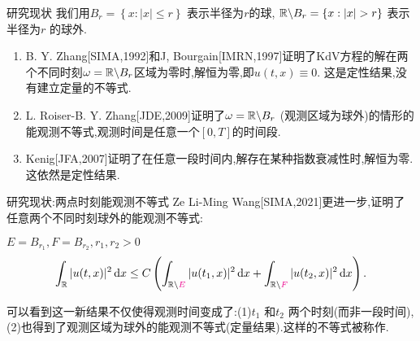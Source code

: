 \begin{frame}{研究现状}
  我们用$B_r=\left\{x:|x|\le r\right\} $ 表示半径为$r$的球,  $\R\backslash B_r=\left\{x:|x|>r\right\} $ 表示半径为$r$ 的球外.
  \begin{enumerate}
    \item B. Y. Zhang[SIMA,1992]和J, Bourgain[IMRN,1997]证明了KdV方程的解在两个不同时刻$\omega=\mathbb{R} \backslash  B_r$区域为零时,解恒为零,即$u(t,x)\equiv 0$. 这是定性结果,没有建立定量的不等式.
    \item L. Roiser-B. Y. Zhang[JDE,2009]证明了$\omega=\mathbb{R} \backslash B_r$ (观测区域为球外)的情形的能观测不等式,观测时间是任意一个$[0,T]$的时间段.
    \item Kenig[JFA,2007]证明了在任意一段时间内,解存在某种指数衰减性时,解恒为零.这依然是定性结果.
  \end{enumerate}
\end{frame}
\begin{frame}{研究现状:两点时刻能观测不等式}
  Ze Li-Ming Wang[SIMA,2021]更进一步,证明了任意两个不同时刻球外的能观测不等式:
  \begin{block}{$E=B_{r_1},F=B_{r_2},r_1,r_2>0$}
    \[
      \int_{\mathbb{R}}|u(t,x)|^2\,\mathrm{d}x\le C \left( \int_{\mathbb{R}\backslash \color{magenta}E}|u(t_1,x)|^2\,\mathrm{d}x+\int_{\mathbb{R} \backslash \color{magenta} F}|u(t_2,x)|^2\,\mathrm{d}x \right). 
    \] 
  \end{block}
  可以看到这一新结果不仅使得观测时间变成了:(1)$t_1$ 和$t_2$ 两个时刻(而非一段时间),(2)也得到了观测区域为球外的能观测不等式(定量结果).这样的不等式被称作\color{red}{两点时刻能观测不等式}.

\end{frame}


